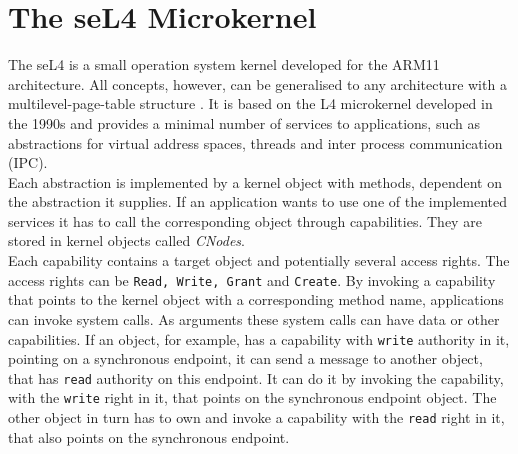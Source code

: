 \section{The seL4 Microkernel}\label{sec:seL4}
	The seL4 \cite{Manual} is a small operation system kernel developed for the ARM11 architecture. All concepts, however, can be generalised to any architecture with a multilevel-page-table structure \cite{PhDseL4}. It is based on the L4 microkernel developed in the 1990s and provides a minimal number of services to applications, such as abstractions for virtual address spaces, threads and inter process communication (IPC). \\
	Each abstraction is implemented by a kernel object with methods, dependent on the abstraction it supplies. If an application wants to use one of the implemented services it has to call the corresponding object through capabilities. They are stored in kernel objects called \textit{CNodes}. \\
	Each capability contains a target object and potentially several access rights. The access rights can be \texttt{Read, Write, Grant} and \texttt{Create}. By invoking a capability that points to the kernel object  with a corresponding method name, applications can invoke system calls. As arguments these system calls can have data or other capabilities. If an object, for example, has a capability with \texttt{write} authority in it, pointing on a synchronous endpoint, it can send a message to another object, that has \texttt{read} authority on this endpoint. It can do it by invoking the capability, with the \texttt{write} right in it, that points on the synchronous endpoint object. The other object in turn has to own and invoke a capability with the \texttt{read} right in it, that also points on the synchronous endpoint.

